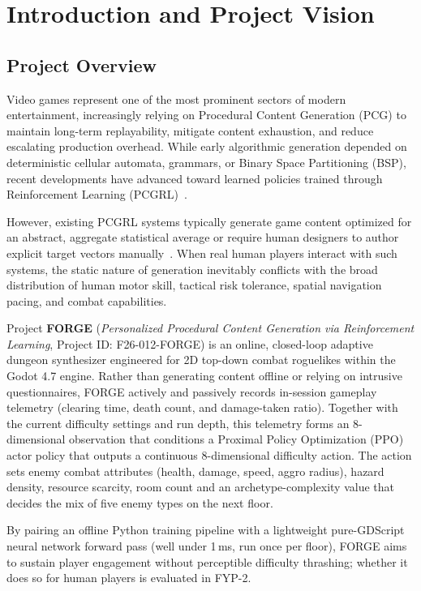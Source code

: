 \chapter{Introduction and Project Vision}
\label{chap:intro}

\section{Project Overview}
Video games represent one of the most prominent sectors of modern entertainment, increasingly relying on Procedural Content Generation (PCG) to maintain long-term replayability, mitigate content exhaustion, and reduce escalating production overhead. While early algorithmic generation depended on deterministic cellular automata, grammars, or Binary Space Partitioning (BSP), recent developments have advanced toward learned policies trained through Reinforcement Learning (PCGRL)~\cite{khalifa2020pcgrl}. 

However, existing PCGRL systems typically generate game content optimized for an abstract, aggregate statistical average or require human designers to author explicit target vectors manually~\cite{earle2021controllable}. When real human players interact with such systems, the static nature of generation inevitably conflicts with the broad distribution of human motor skill, tactical risk tolerance, spatial navigation pacing, and combat capabilities.

Project \textbf{FORGE} (\textit{Personalized Procedural Content Generation via Reinforcement Learning}, Project ID: F26-012-FORGE) is an online, closed-loop adaptive dungeon synthesizer engineered for 2D top-down combat roguelikes within the Godot 4.7 engine. Rather than generating content offline or relying on intrusive questionnaires, FORGE actively and passively records in-session gameplay telemetry (clearing time, death count, and damage-taken ratio). Together with the current difficulty settings and run depth, this telemetry forms an 8-dimensional observation that conditions a Proximal Policy Optimization (PPO)~\cite{schulman2017proximal} actor policy that outputs a continuous 8-dimensional difficulty action. The action sets enemy combat attributes (health, damage, speed, aggro radius), hazard density, resource scarcity, room count and an archetype-complexity value that decides the mix of five enemy types on the next floor. 

By pairing an offline Python training pipeline with a lightweight pure-GDScript neural network forward pass (well under 1\,ms, run once per floor), FORGE aims to sustain player engagement without perceptible difficulty thrashing; whether it does so for human players is evaluated in FYP-2.


